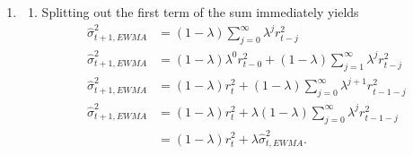 \documentclass[11pt, a4paper]{article}
\begin{document}
\begin{enumerate}
\begin{enumerate}
\end{enumerate}
\item
\begin{enumerate}
\item Splitting out the first term of the sum immediately yields
\begin{align*}
 \widehat{\sigma}_{t+1,EWMA}^{2}  &=(1-\lambda )\sum_{j=0}^{\infty }\lambda ^{j}r_{t-j}^{2} \\
 \widehat{\sigma}_{t+1,EWMA}^{2}  &=(1-\lambda ) \lambda^0 r_{t-0}^2+(1-\lambda )\sum_{j=1}^{\infty }\lambda ^{j}r_{t-j}^{2} \\
 \widehat{\sigma}_{t+1,EWMA}^{2}  &=(1-\lambda ) r_{t}^2+(1-\lambda )\sum_{j=0}^{\infty }\lambda ^{j+1}r_{t-1-j}^{2} \\
 \widehat{\sigma}_{t+1,EWMA}^{2}  &=(1-\lambda ) r_{t}^2+\lambda(1-\lambda )\sum_{j=0}^{\infty }\lambda ^{j}r_{t-1-j}^{2} \\
&=(1-\lambda )r_{t}^{2}+\lambda\widehat{\sigma}_{t,EWMA}^{2}.
\end{align*}

\end{enumerate}
\end{enumerate}
\end{document}
